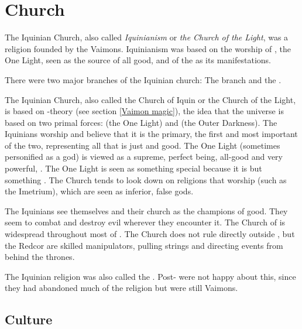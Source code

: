 \section{\Iquinian Church}
The Iquinian Church, also called \emph{Iquinianism} or \emph{the Church of the Light}, was a religion founded by the Vaimons. 
Iquinianism was based on the worship of \iquin{}, the One Light, seen as the source of all good, and of the \Sephiroth{} as its manifestations. 

There were two major branches of the Iquinian church: 
The  branch and the . 

The Iquinian Church, also called the {Church of Iquin} or the {Church of the Light}, is based on \Iquin-\Nieur theory (see section \ref{Vaimon magic}), the idea that the universe is based on two primal forces: 
\Iquin (the One Light) and \Nieur (the Outer Darkness). 
The Iquinians worship \Iquin and believe that it is the primary, the first and most important of the two, representing all that is just and good. 
The One Light (sometimes personified as a god) is viewed as a supreme, perfect being, all-good and very powerful, . 
The One Light is seen as something special because it is  but something . 
The Church tends to look down on religions that worship  (such as the Imetrium), which are seen as inferior, false gods. 

The Iquinians see themselves and their church as the champions of good. 
They seem to combat and destroy evil wherever they encounter it. 
The Church of \Iquin is widespread throughout most of \Velcad{}. 
The Church does not rule directly outside \Redce{}, but the Redcor are skilled manipulators, pulling strings and directing events from behind the thrones. 

The Iquinian religion was also called the .
Post-\caliphate {} were not happy about this, since they had abandoned much of the religion but were still Vaimons.







\subsection{Culture}





